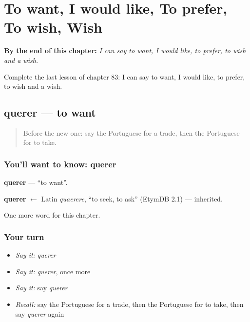 
\chapter{To want, I would like, To prefer, To wish, Wish}
\label{ch:pt-to-want-i-would-like-to-prefer-to-wish-wish}

\begin{chapteropening}
\textbf{By the end of this chapter:} \emph{I can say to want, I would like, to prefer, to wish and a wish.}

Complete the last lesson of chapter 83: I can say to want, I would like, to prefer, to wish and a wish.
\end{chapteropening}

\section[querer]{querer — to want}

\label{lesson:PT-C83-querer}



\begin{quote}
Before the new one: say the Portuguese for a trade, then the Portuguese for to take.
\end{quote}

\subsection*{You'll want to know: querer}
\textbf{querer} — \textquotedblleft{}to want\textquotedblright{}.

\begin{cousinweb}
\textbf{querer} $\leftarrow$ Latin \emph{quaerere}, \textquotedblleft{}to seek, to ask\textquotedblright{} (EtymDB 2.1) — inherited.
\end{cousinweb}

\begin{grammarlens}[title={What you've built}]
One more word for this chapter.
\end{grammarlens}

\subsection*{Your turn}
\begin{itemize}
\raggedright
  \item \emph{Say it:} \emph{querer}
  \item \emph{Say it:} \emph{querer}, once more
  \item \emph{Say it:} say \emph{querer}
  \item \emph{Recall:} say the Portuguese for a trade, then the Portuguese for to take, then say \emph{querer} again
\end{itemize}

